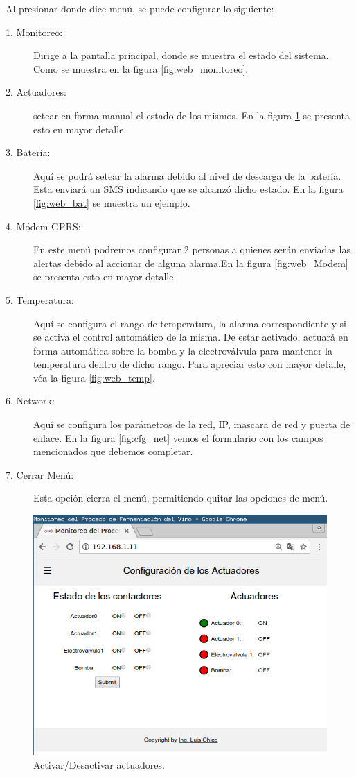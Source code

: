 Al presionar donde dice menú, se puede configurar lo siguiente:
\begin{description}
  \item[1. Monitoreo:] Dirige a la pantalla principal, donde se muestra el estado del sistema. Como se muestra en la figura \ref{fig:web_monitoreo}.
  \item[2. Actuadores:] setear en forma manual el estado de los mismos. En la figura \ref{fig:web_act} se presenta esto en mayor detalle.
  \item[3. Batería:] Aquí se podrá setear la alarma debido al nivel de descarga de la batería. Esta enviará un SMS indicando que se alcanzó dicho estado. En la figura \ref{fig:web_bat} se muestra un ejemplo.
  \item[4. Módem GPRS:] En este menú podremos configurar 2 personas a quienes serán enviadas las alertas debido al accionar de alguna alarma.En la figura \ref{fig:web_Modem} se presenta esto en mayor detalle.
  \item[5. Temperatura:] Aquí se configura el rango de temperatura, la alarma correspondiente y si se activa el control automático de la misma. De estar activado, actuará en forma automática sobre la bomba y la electroválvula para mantener la temperatura dentro de dicho rango. Para apreciar esto con mayor detalle, véa la figura \ref{fig:web_temp}.
  \item[6. Network:] Aquí se configura los parámetros de la red, IP, mascara de red y puerta de enlace. En la figura \ref{fig:cfg_net} vemos el formulario con los campos mencionados que debemos completar.
  \item[7. Cerrar Menú:] Esta opción cierra el menú, permitiendo quitar las opciones de menú.
\end{description}

\begin{figure}[h]
  \centering
  \includegraphics[scale=.35]{./Figures/config_act.png}
  \caption{ Activar/Desactivar actuadores.}
  \label{fig:web_act}
\end{figure}

